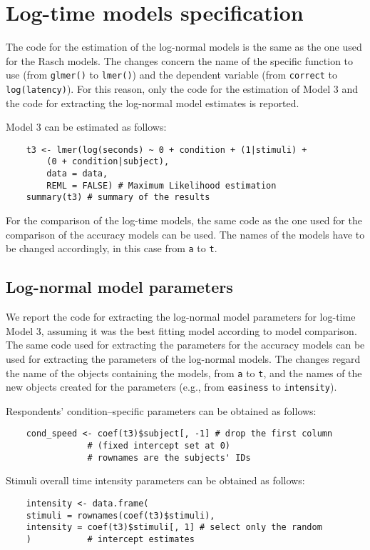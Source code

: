\documentclass[12pt]{book}
\begin{document}
\section{Log-time models specification}

The code for the estimation of the log-normal models is the same as the one used for the Rasch models. The changes concern the name of the specific function to use (from \texttt{glmer()} to \texttt{lmer()}) and the dependent variable (from \texttt{correct} to \texttt{log(latency)}). 
For this reason, only the code for the estimation of Model 3 and the code for extracting the log-normal model estimates is reported.

Model 3 can be estimated as follows: 
%
\begin{lstlisting}
	t3 <- lmer(log(seconds) ~ 0 + condition + (1|stimuli) + 
		(0 + condition|subject),
		data = data,
		REML = FALSE) # Maximum Likelihood estimation
	summary(t3) # summary of the results
\end{lstlisting}
%
For the comparison of the log-time models, the same code as the one used for the comparison of the accuracy models can be used. 
The names of the models have to be changed accordingly, in this case from \texttt{a} to \texttt{t}.

\subsection{Log-normal model parameters}
	
We report the code for extracting the log-normal model parameters for log-time Model 3, assuming it was the best fitting model according to model comparison. The same code used for extracting the parameters for the accuracy models can be used for extracting the parameters of the log-normal models. The changes regard the name of the objects containing the models, from \texttt{a} to \texttt{t}, and the names of the new objects created for the parameters (e.g., from \texttt{easiness} to \texttt{intensity}).

Respondents' condition--specific parameters can be obtained as follows: 
%
\begin{lstlisting}
	cond_speed <- coef(t3)$subject[, -1] # drop the first column 
				# (fixed intercept set at 0)
				# rownames are the subjects' IDs
\end{lstlisting}

Stimuli overall time intensity parameters can be obtained as follows: 
%
\begin{lstlisting}
	intensity <- data.frame(
	stimuli = rownames(coef(t3)$stimuli),
	intensity = coef(t3)$stimuli[, 1] # select only the random
	)			# intercept estimates	
\end{lstlisting}	


\newpage
% 
%
\end{document}
